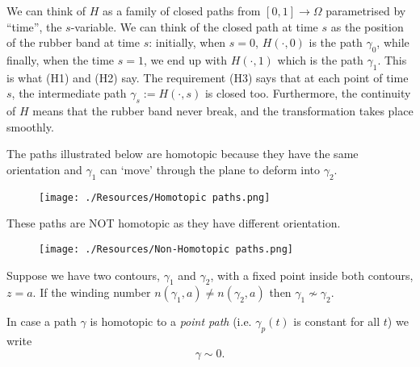 \documentclass[12pt, a4paper]{article}
\begin{document}
\begin{mdnote}
    We can think of \(H\) as a family of closed paths from \([0,1] \to \Omega\) parametrised by ``time'', the \(s\)-variable. We can think of the closed path at time \(s\) as the position of the rubber band at time \(s\): initially, when \(s=0\), \(H(\cdot,0)\) is the path \(\gamma_0\), while finally, when the time \(s=1\), we end up with \(H(\cdot,1)\) which is the path \(\gamma_1\). This is what (H1) and (H2) say. The requirement (H3) says that at each point of time \(s\), the intermediate path \(\gamma_s := H(\cdot,s)\) is closed too. Furthermore, the continuity of \(H\) means that the rubber band never break, and the transformation takes place smoothly.
\end{mdnote}

\begin{example}
    The paths illustrated below are homotopic because they have the same orientation and \(\gamma_1\) can `move' through the plane to deform into \(\gamma_2\).
    \begin{figure}[H]
         \begin{center}
             \texttt{[image: ./Resources/Homotopic paths.png]}
         \end{center}
    \end{figure}
\end{example}

\begin{example}
    These paths are NOT homotopic as they have different orientation.
    \begin{figure}[H]
         \begin{center}
             \texttt{[image: ./Resources/Non-Homotopic paths.png]}
         \end{center}
    \end{figure}
\end{example}

\begin{example}
   Suppose we have two contours, \(\gamma_1\) and \(\gamma_2\), with a fixed point inside both contours, \(z=a\). If the winding number \(n(\gamma_1,a)\neq n(\gamma_2,a)\) then \(\gamma_1 \not\sim \gamma_2\).
\end{example}

\begin{definition}
    In case a path \(\gamma\) is homotopic to a \textit{point path} (i.e. \(\gamma_p(t)\) is constant for all \(t\)) we write 
    \[\gamma \sim 0.\]
\end{definition}
\end{document}
